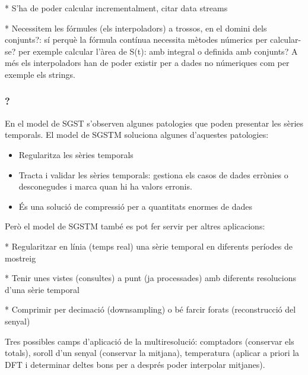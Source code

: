 * S'ha de poder calcular incrementalment, citar data streams

* Necessitem les fórmules (els interpoladors) a trossos, en el domini dels conjunts?: sí perquè la fórmula contínua necessita mètodes númerics per calcular-se? per exemple calcular l'àrea de S(t): amb integral o definida amb conjunts?
A més els interpoladors han de poder existir per a dades no númeriques com per exemple els strings.











\subsubsection{?}




En el model de SGST s'observen algunes patologies que poden presentar les sèries temporals. El model de SGSTM soluciona algunes d'aquestes patologies:

\begin{itemize}
\item Regularitza les sèries temporals
\item Tracta i validar les sèries temporals: gestiona els casos de dades errònies o desconegudes i marca quan hi ha valors erronis.
\item És una solució de compressió per a quantitats enormes de dades
\end{itemize}


Però el model de SGSTM també es pot fer servir per altres aplicacions:

* Regularitzar en línia (temps real) una sèrie temporal en diferents períodes de mostreig

* Tenir unes vistes (consultes) a punt (ja processades) amb diferents resolucions d'una sèrie temporal

* Comprimir per decimació (downsampling) o bé farcir forats (reconstrucció del senyal)


Tres possibles camps d'aplicació de la multiresolució: comptadors (conservar els totals), soroll d'un senyal (conservar la mitjana), temperatura (aplicar a priori la DFT i determinar deltes bons per a després poder interpolar mitjanes).





